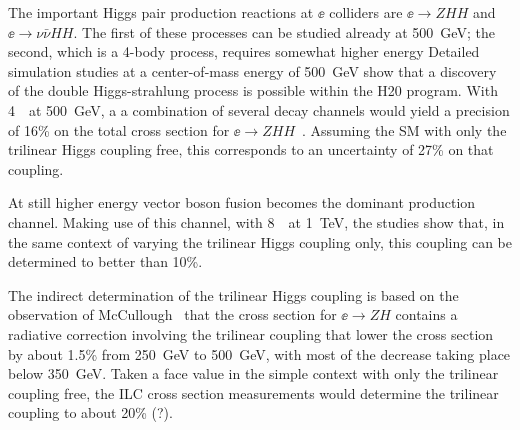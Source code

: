 The important Higgs pair production reactions at $\ee$ colliders are 
$\ee\to ZHH$ and $\ee\to \nu\bar\nu HH$.    The first of these
processes can be studied already at 500~GeV; the second, which is a
4-body process, requires
somewhat higher energy
Detailed simulation studies at a center-of-mass energy of 500~GeV show that a discovery of the
double Higgs-strahlung process is possible within the H20 program.
With 4~\iab\ at 500~GeV, a
a combination of several decay channels
would yield a precision of 16\% on the total cross section for
$\ee\to ZHH$~\cite{Duerig:2016dvi}.   Assuming the SM with only the
trilinear Higgs coupling free, this corresponds to an uncertainty of
27\% on that coupling.

At still higher energy vector boson fusion becomes the dominant
production channel. Making use of this channel, with  8~\iab\ at
1~TeV, the studies \cite{TianHHH,Roloff:2019crr} show that, in the
same context of varying the trilinear Higgs coupling only, this
coupling can be determined to better than 10\%. 



The indirect determination of the trilinear Higgs coupling is based on
the observation of McCullough~\cite{McCullough:2013rea} that the cross
section for $\ee\to ZH$ contains a radiative correction involving the
trilinear coupling that lower the cross section by about 1.5\% from
250~GeV to 500~GeV, with most of the decrease taking place below
350~GeV.  Taken a face value in the simple context with only the
trilinear coupling free, the ILC cross section measurements would determine the trilinear 
coupling to about 20\% (?).

